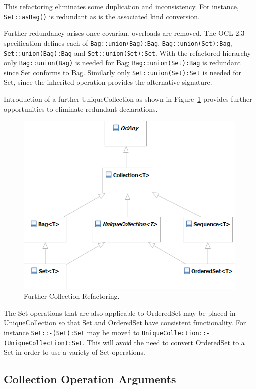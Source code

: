 \documentclass{eceasst}
\begin{document}
This refactoring eliminates some duplication and inconsistency. For instance, \verb|Set::asBag()| is redundant as is the associated kind conversion.

Further redundancy arises once covariant overloads are removed. The OCL 2.3 specification defines each of \verb|Bag::union(Bag):Bag|,  \verb|Bag::union(Set):Bag|,  \verb|Set::union(Bag):Bag| and  \verb|Set::union(Set):Set|. With the refactored hierarchy only \verb|Bag::union(Bag)| is needed for Bag; \verb|Bag::union(Set):Bag| is redundant since Set conforms to Bag. Similarly only \verb|Set::union(Set):Set| is needed for Set, since the inherited operation provides the alternative signature.

Introduction of a further UniqueCollection as shown in Figure~\ref{fig:Collections_2_4} provides further opportunities to eliminate redundant declarations.

\begin{figure}
  \begin{center}
    \includegraphics[width=4.5in]{Collections_2_4.png}
  \end{center}
  \caption{Further Collection Refactoring.}
  \label{fig:Collections_2_4}
\end{figure}

The Set operations that are also applicable to OrderedSet may be placed in UniqueCollection so that Set and OrderedSet have consistent functionality. For instance \verb|Set::-(Set):Set| may be moved to \verb|UniqueCollection::-(UniqueCollection):Set|. This will avoid the need to convert OrderedSet to a Set in order to use a variety of Set operations.

\subsection{Collection Operation Arguments}
\end{document}
